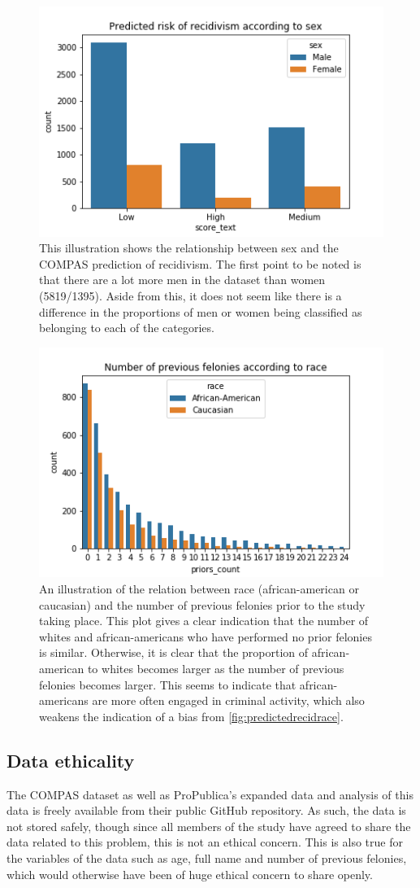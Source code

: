 \documentclass[11pt, fleqn, titlepage]{article}
\begin{document}
	\begin{figure}[H]
		\centering
		\includegraphics[width=0.5\linewidth]{imgs/predicted_recid_sex}
		\caption{This illustration shows the relationship between sex and the COMPAS prediction of recidivism. The first point to be noted is that there are a lot more men in the dataset than women (5819/1395). Aside from this, it does not seem like there is a difference in the proportions of men or women being classified as belonging to each of the categories.}
		\label{fig:predictedrecidsex}
	\end{figure}
	
	\begin{figure}[H]
		\centering
		\includegraphics[width=0.5\linewidth]{imgs/proirs}
		\caption{An illustration of the relation between race (african-american or caucasian) and the number of previous felonies prior to the study taking place. This plot gives a clear indication that the number of whites and african-americans who have performed no prior felonies is similar. Otherwise, it is clear that the proportion of african-american to whites becomes larger as the number of previous felonies becomes larger. This seems to indicate that african-americans are more often engaged in criminal activity, which also weakens the indication of a bias from \ref{fig:predictedrecidrace}.}
		\label{fig:proirs}
	\end{figure}
	
	
	
	\subsection{Data ethicality}
	The COMPAS dataset as well as ProPublica's expanded data and analysis of this data is freely available from their public GitHub repository. As such, the data is not stored safely, though since all members of the study have agreed to share the data related to this problem, this is not an ethical concern. This is also true for the variables of the data such as age, full name and number of previous felonies, which would otherwise have been of huge ethical concern to share openly. 
	
\end{document}
